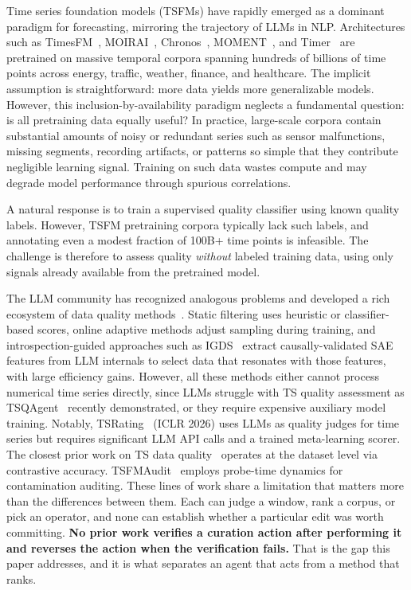 \documentclass{article}
\begin{document}
Time series foundation models (TSFMs) have rapidly emerged as a dominant paradigm for forecasting, mirroring the trajectory of LLMs in NLP. Architectures such as TimesFM~\citep{das2024timesfm}, MOIRAI~\citep{woo2024moirai}, Chronos~\citep{ansari2024chronos}, MOMENT~\citep{goswami2024moment}, and Timer~\citep{liu2024timer} are pretrained on massive temporal corpora spanning hundreds of billions of time points across energy, traffic, weather, finance, and healthcare. The implicit assumption is straightforward: more data yields more generalizable models. However, this inclusion-by-availability paradigm neglects a fundamental question: is all pretraining data equally useful? In practice, large-scale corpora contain substantial amounts of noisy or redundant series such as sensor malfunctions, missing segments, recording artifacts, or patterns so simple that they contribute negligible learning signal. Training on such data wastes compute and may degrade model performance through spurious correlations.

A natural response is to train a supervised quality classifier using known quality labels. However, TSFM pretraining corpora typically lack such labels, and annotating even a modest fraction of 100B+ time points is infeasible. The challenge is therefore to assess quality \emph{without} labeled training data, using only signals already available from the pretrained model.

The LLM community has recognized analogous problems and developed a rich ecosystem of data quality methods~\citep{xie2023doremi, wettig2024qurating, bai2025multi}. Static filtering uses heuristic or classifier-based scores, online adaptive methods adjust sampling during training, and introspection-guided approaches such as IGDS~\citep{shi2026igds} extract causally-validated SAE features from LLM internals to select data that resonates with those features, with large efficiency gains. However, all these methods either cannot process numerical time series directly, since LLMs struggle with TS quality assessment as TSQAgent~\citep{wu2026tsqagent} recently demonstrated, or they require expensive auxiliary model training. Notably, TSRating~\citep{chen2026tsrating} (ICLR 2026) uses LLMs as quality judges for time series but requires significant LLM API calls and a trained meta-learning scorer. The closest prior work on TS data quality~\citep{wen2024measuring} operates at the dataset level via contrastive accuracy. TSFMAudit~\citep{li2026tsfmaudit} employs probe-time dynamics for contamination auditing. These lines of work share a limitation that matters more than the differences between them. Each can judge a window, rank a corpus, or pick an operator, and none can establish whether a particular edit was worth committing. \textbf{No prior work verifies a curation action after performing it and reverses the action when the verification fails.} That is the gap this paper addresses, and it is what separates an agent that acts from a method that ranks.
\end{document}
